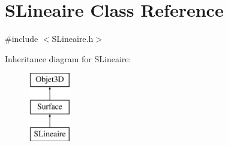 \hypertarget{classSLineaire}{\section{S\-Lineaire Class Reference}
\label{classSLineaire}
}


{\ttfamily \#include $<$S\-Lineaire.\-h$>$}

Inheritance diagram for S\-Lineaire\-:\begin{figure}[H]
\begin{center}
\leavevmode
\includegraphics[height=3.000000cm]{classSLineaire}
\end{center}
\end{figure}
